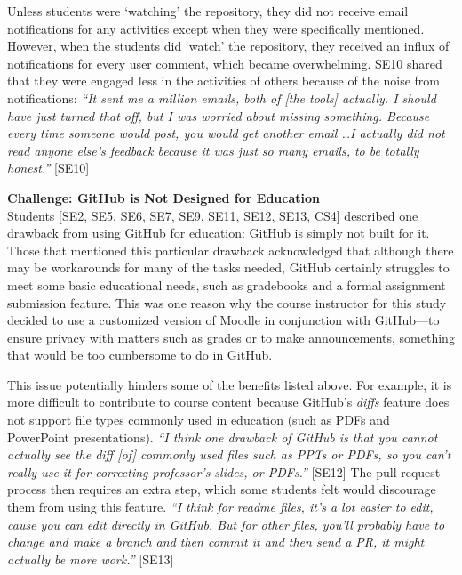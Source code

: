 Unless students were `watching' the repository, they did not receive email notifications for any activities except when they were specifically mentioned. However, when the students did `watch' the repository, they received an influx of notifications for every user comment, which became overwhelming. SE10 shared that they were engaged less in the activities of others because of the noise from notifications: \textit{``It sent me a million emails, both of [the tools] actually. I should have just turned that off, but I was worried about missing something. Because every time someone would post, you would get another email \ldots I actually did not read anyone else's feedback because it was just so many emails, to be totally honest.''} [SE10]


\textbf{Challenge: GitHub is Not Designed for Education}\\
Students [SE2, SE5, SE6, SE7, SE9, SE11, SE12, SE13, CS4] described one drawback from using GitHub for education: GitHub is simply not built for it. Those that mentioned this particular drawback acknowledged that although there may be workarounds for many of the tasks needed, GitHub certainly struggles to meet some basic educational needs, such as gradebooks and a formal assignment submission feature. This was one reason why the course instructor for this study decided to use a customized version of Moodle in conjunction with GitHub---to ensure privacy with matters such as grades or to make announcements, something that would be too cumbersome to do in GitHub.

This issue potentially hinders some of the benefits listed above. For example, it is more difficult to contribute to course content because GitHub's \emph{diffs} feature does not support file types commonly used in education (such as PDFs and PowerPoint presentations). \textit{``I think one drawback of GitHub is that you cannot actually see the diff [of] commonly used files such as PPTs or PDFs, so you can't really use it for correcting professor's slides, or PDFs.''} [SE12] The pull request process then requires an extra step, which some students felt would discourage them from using this feature. \textit{``I think for readme files, it's a lot easier to edit, cause you can edit directly in GitHub. But for other files, you'll probably have to change and make a branch and then commit it and then send a PR, it might actually be more work.''} [SE13]

